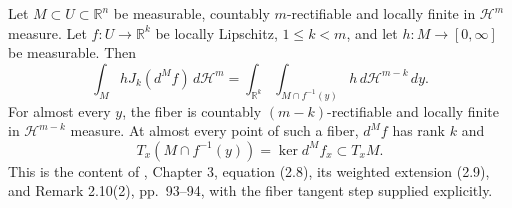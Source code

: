 \begin{theorem}\label{thm:rectifiable-coarea-chart-proof}
Let $M\subset U\subset\mathbb R^n$ be measurable, countably $m$-rectifiable and locally finite in $\mathcal H^m$ measure. Let $f:U\to\mathbb R^k$ be locally Lipschitz, $1\leq k<m$, and let $h:M\to[0,\infty]$ be measurable. Then
\[
 \int_M hJ_k(d^Mf)\,d\mathcal H^m
 =\int_{\mathbb R^k}\int_{M\cap f^{-1}(y)}h\,d\mathcal H^{m-k}\,dy.
\]
For almost every $y$, the fiber is countably $(m-k)$-rectifiable and locally finite in $\mathcal H^{m-k}$ measure. At almost every point of such a fiber, $d^Mf$ has rank $k$ and
\[
 T_x(M\cap f^{-1}(y))=\ker d^Mf_x\subset T_xM.
\]
This is the content of \cite{Sim18}, Chapter 3, equation (2.8), its weighted extension (2.9), and Remark 2.10(2), pp.~93--94, with the fiber tangent step supplied explicitly.
\end{theorem}
